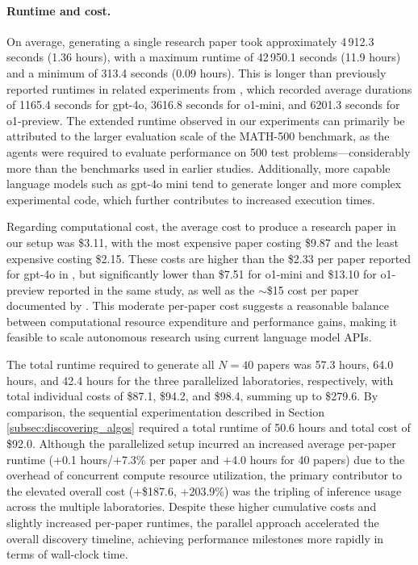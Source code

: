 \documentclass[11pt, a4paper]{include/gdm_format}
\begin{document}
\paragraph{Runtime and cost.}  
On average, generating a single research paper took approximately 4\,912.3 seconds (1.36 hours), with a maximum runtime of 42\,950.1 seconds (11.9 hours) and a minimum of 313.4 seconds (0.09 hours). This is longer than previously reported runtimes in related experiments from \cite{schmidgall2025agent}, which recorded average durations of 1165.4 seconds for gpt-4o, 3616.8 seconds for o1-mini, and 6201.3 seconds for o1-preview. The extended runtime observed in our experiments can primarily be attributed to the larger evaluation scale of the MATH-500 benchmark, as the agents were required to evaluate performance on 500 test problems—considerably more than the benchmarks used in earlier studies. Additionally, more capable language models such as gpt-4o mini tend to generate longer and more complex experimental code, which further contributes to increased execution times.

Regarding computational cost, the average cost to produce a research paper in our setup was \$3.11, with the most expensive paper costing \$9.87 and the least expensive costing \$2.15. These costs are higher than the \$2.33 per paper reported for gpt-4o in \cite{schmidgall2025agent}, but significantly lower than \$7.51 for o1-mini and \$13.10 for o1-preview reported in the same study, as well as the $\sim$\$15 cost per paper documented by \cite{lu2024aiscientist}. This moderate per-paper cost suggests a reasonable balance between computational resource expenditure and performance gains, making it feasible to scale autonomous research using current language model APIs.

The total runtime required to generate all \(N=40\) papers was 57.3 hours, 64.0 hours, and 42.4 hours for the three parallelized laboratories, respectively, with total individual costs of \$87.1, \$94.2, and \$98.4, summing up to \$279.6. By comparison, the sequential experimentation described in Section \ref{subsec:discovering_algos} required a total runtime of 50.6 hours and total cost of \$92.0. Although the parallelized setup incurred an increased average per-paper runtime ({\color{darkpastelred}+0.1 hours/+7.3\% per paper} and {\color{darkpastelred}+4.0 hours} for 40 papers) due to the overhead of concurrent compute resource utilization, the primary contributor to the elevated overall cost ({\color{darkpastelred}+\$187.6, +203.9\%}) was the tripling of inference usage across the multiple laboratories. Despite these higher cumulative costs and slightly increased per-paper runtimes, the parallel approach accelerated the overall discovery timeline, achieving performance milestones more rapidly in terms of wall-clock time.
\end{document}
